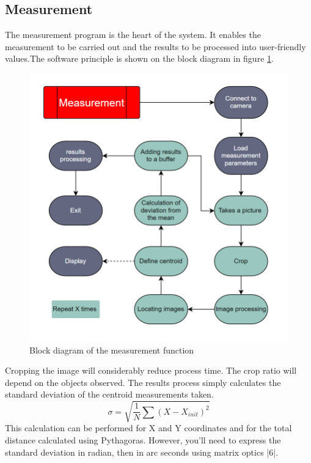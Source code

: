 \subsection{Measurement}
The measurement program is the heart of the system. It enables the measurement to be carried out and the results to be
processed into user-friendly values.The software principle is shown on the block diagram in figure \ref{fig:Soft_Meas}.
\begin{figure}[H]
    \centering
    \includegraphics[scale=0.85]{assets/figures/Software/Measurement.png}
    \caption{Block diagram of the measurement function}
    \label{fig:Soft_Meas}
\end{figure}
Cropping the image will considerably reduce process time. The crop ratio will depend on the objects observed.
\bigbreak
The results process simply calculates the standard deviation of the centroid measurements taken.
\begin{equation}
    \sigma = \sqrt{\frac{1}{N}\sum\left(X-X_{init}\right)^2}
\end{equation}
This calculation can be performed for X and Y coordinates and for the total distance calculated using Pythagoras.
However, you'll need to express the standard deviation in radian, then in arc seconds using matrix optics |6|.
